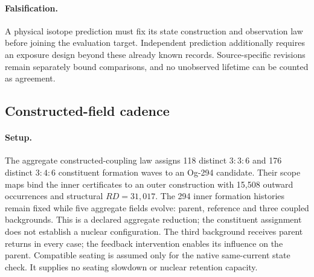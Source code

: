 \paragraph{Falsification.}
A physical isotope prediction must fix its state construction and observation law before
joining the evaluation target. Independent prediction additionally requires an exposure
design beyond these already known records. Source-specific revisions remain separately
bound comparisons, and no unobserved lifetime can be counted as agreement.


\subsection{Constructed-field cadence}
\label{manual2:constructed-coupling}
\paragraph{Setup.}
The aggregate constructed-coupling law assigns 118 distinct \(3{:}3{:}6\) and
176 distinct \(3{:}4{:}6\) constituent formation waves to an Og-294 candidate.
Their scope maps bind the inner certificates to an outer construction with
15,508 outward occurrences and structural \(RD=31{,}017\). The 294 inner
formation histories remain fixed while five aggregate fields evolve: parent,
reference and three coupled backgrounds. This is a declared aggregate reduction;
the constituent assignment does not establish a nuclear configuration.
The third background receives parent returns in every case; the feedback
intervention enables its influence on the parent. Compatible seating is assumed
only for the native same-current state check. It supplies no seating slowdown or
nuclear retention capacity.

